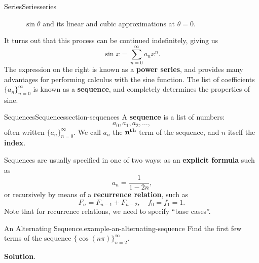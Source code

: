 \documentclass[oneside,10pt,]{book}
\newcommand{\terminology}[1]{\textbf{#1}}
\numberwithin{equation}{section}
\begin{document}
\begin{chapterptx}{Series}{}{Series}{}{}{series}
\begin{introduction}{}
\begin{figure}
{
}
\caption{\(\sin\theta\) and its linear and cubic approximations at \(\theta=0\).\label{figure-sine-cubic-approximation}}
\end{figure}
\hypertarget{p-785}{}%
It turns out that this process can be continued indefinitely, giving us%
\begin{equation*}
\sin x = \sum_{n=0}^{\infty}a_{n}x^{n}.
\end{equation*}
The expression on the right is known as a \terminology{power series}, and provides many advantages for performing calculus with the sine function. The list of coefficients \(\{a_{n}\}_{n=0}^{\infty}\) is known as a \terminology{sequence}, and completely determines the properties of sine.%
\end{introduction}%
%
%
\typeout{************************************************}
\typeout{************************************************}
%
\begin{sectionptx}{Sequences}{}{Sequences}{}{}{section-sequences}
\hypertarget{p-786}{}%
A \terminology{sequence} is a list of numbers:%
\begin{equation*}
a_{0}, a_{1}, a_{2}, \ldots,
\end{equation*}
often written \(\{a_{n}\}_{n=0}^{\infty}\). We call \(a_{n}\) the \(\mathbf{n}^{\text{\textbf{th}}}\) term of the sequence, and \(n\) itself the \terminology{index}.%
\par
\hypertarget{p-787}{}%
Sequences are usually specified in one of two ways: as an \terminology{explicit formula} such as%
\begin{equation*}
a_{n} = \frac{1}{1 - 2n}\text{,}
\end{equation*}
or recursively by means of a \terminology{recurrence relation}, such as%
\begin{equation*}
F_{n} = F_{n-1} + F_{n-2}, \quad f_{0} = f_{1} = 1.
\end{equation*}
Note that for recurrence relations, we need to specify ``base cases''.%
\begin{example}{An Alternating Sequence.}{example-an-alternating-sequence}%
\hypertarget{p-788}{}%
Find the first few terms of the sequence \(\{\cos(n\pi)\}_{n=2}^{\infty}\).%
\par\smallskip%
\noindent\textbf{Solution}.\hypertarget{solution-162}{}\quad%
\hypertarget{p-789}{}%

\end{example}
\end{sectionptx}
\end{chapterptx}
\end{document}
